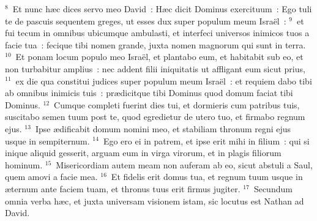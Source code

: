 ${}^{8}$~Et nunc h\ae c dices servo meo David~: H\ae c dicit Dominus exercituum~: Ego tuli te de pascuis sequentem greges, ut esses dux super populum meum Isra\"el~:
${}^{9}$~et fui tecum in omnibus ubicumque ambulasti, et interfeci universos inimicos tuos a facie tua~: fecique tibi nomen grande, juxta nomen magnorum qui sunt in terra.
${}^{10}$~Et ponam locum populo meo Isra\"el, et plantabo eum, et habitabit sub eo, et non turbabitur amplius~: nec addent filii iniquitatis ut affligant eum sicut prius,
${}^{11}$~ex die qua constitui judices super populum meum Isra\"el~: et requiem dabo tibi ab omnibus inimicis tuis~: pr\ae dicitque tibi Dominus quod domum faciat tibi Dominus.
${}^{12}$~Cumque completi fuerint dies tui, et dormieris cum patribus tuis, suscitabo semen tuum post te, quod egredietur de utero tuo, et firmabo regnum ejus.
${}^{13}$~Ipse \ae dificabit domum nomini meo, et stabiliam thronum regni ejus usque in sempiternum.
${}^{14}$~Ego ero ei in patrem, et ipse erit mihi in filium~: qui si inique aliquid gesserit, arguam eum in virga virorum, et in plagis filiorum hominum.
${}^{15}$~Misericordiam autem meam non auferam ab eo, sicut abstuli a Saul, quem amovi a facie mea.
${}^{16}$~Et fidelis erit domus tua, et regnum tuum usque in \ae ternum ante faciem tuam, et thronus tuus erit firmus jugiter.
${}^{17}$~Secundum omnia verba h\ae c, et juxta universam visionem istam, sic locutus est Nathan ad David.


